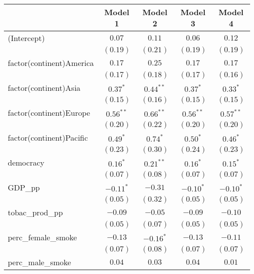 
\begin{table}[!h]
\begin{center}
\begin{tabular}{l c c c c }
\toprule
 & Model 1 & Model 2 & Model 3 & Model 4 \\
\midrule
(Intercept)              & $0.07$       & $0.11$       & $0.06$       & $0.12$       \\
                         & $(0.19)$     & $(0.21)$     & $(0.19)$     & $(0.19)$     \\
factor(continent)America & $0.17$       & $0.25$       & $0.17$       & $0.17$       \\
                         & $(0.17)$     & $(0.18)$     & $(0.17)$     & $(0.16)$     \\
factor(continent)Asia    & $0.37^{*}$   & $0.44^{**}$  & $0.37^{*}$   & $0.33^{*}$   \\
                         & $(0.15)$     & $(0.16)$     & $(0.15)$     & $(0.15)$     \\
factor(continent)Europe  & $0.56^{**}$  & $0.66^{**}$  & $0.56^{**}$  & $0.57^{**}$  \\
                         & $(0.20)$     & $(0.22)$     & $(0.20)$     & $(0.20)$     \\
factor(continent)Pacific & $0.49^{*}$   & $0.74^{*}$   & $0.50^{*}$   & $0.46^{*}$   \\
                         & $(0.23)$     & $(0.30)$     & $(0.24)$     & $(0.23)$     \\
democracy                & $0.16^{*}$   & $0.21^{**}$  & $0.16^{*}$   & $0.15^{*}$   \\
                         & $(0.07)$     & $(0.08)$     & $(0.07)$     & $(0.07)$     \\
GDP\_pp                  & $-0.11^{*}$  & $-0.31$      & $-0.10^{*}$  & $-0.10^{*}$  \\
                         & $(0.05)$     & $(0.32)$     & $(0.05)$     & $(0.05)$     \\
tobac\_prod\_pp          & $-0.09$      & $-0.05$      & $-0.09$      & $-0.10$      \\
                         & $(0.05)$     & $(0.07)$     & $(0.05)$     & $(0.05)$     \\
perc\_female\_smoke      & $-0.13$      & $-0.16^{*}$  & $-0.13$      & $-0.11$      \\
                         & $(0.07)$     & $(0.08)$     & $(0.07)$     & $(0.07)$     \\
perc\_male\_smoke        & $0.04$       & $0.03$       & $0.04$       & $0.01$       \\

\end{tabular}
\end{center}
\end{table}

